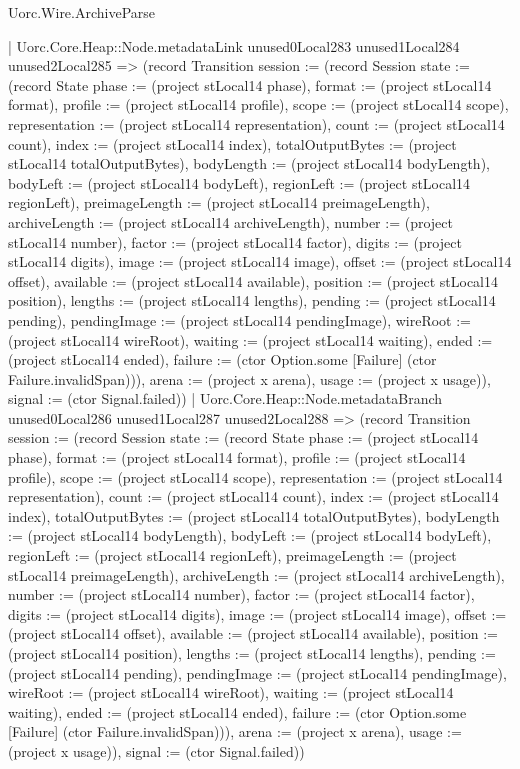 \begin{lexlean}{Uorc.Wire.ArchiveParse}
\begin{semanticmodule}
{            | Uorc.Core.Heap::Node.metadataLink unused0Local283 unused1Local284 unused2Local285 => (record Transition {session := (record Session {state := (record State {phase := (project stLocal14 phase), format := (project stLocal14 format), profile := (project stLocal14 profile), scope := (project stLocal14 scope), representation := (project stLocal14 representation), count := (project stLocal14 count), index := (project stLocal14 index), totalOutputBytes := (project stLocal14 totalOutputBytes), bodyLength := (project stLocal14 bodyLength), bodyLeft := (project stLocal14 bodyLeft), regionLeft := (project stLocal14 regionLeft), preimageLength := (project stLocal14 preimageLength), archiveLength := (project stLocal14 archiveLength), number := (project stLocal14 number), factor := (project stLocal14 factor), digits := (project stLocal14 digits), image := (project stLocal14 image), offset := (project stLocal14 offset), available := (project stLocal14 available), position := (project stLocal14 position), lengths := (project stLocal14 lengths), pending := (project stLocal14 pending), pendingImage := (project stLocal14 pendingImage), wireRoot := (project stLocal14 wireRoot), waiting := (project stLocal14 waiting), ended := (project stLocal14 ended), failure := (ctor Option.some [Failure] (ctor Failure.invalidSpan))}), arena := (project x arena), usage := (project x usage)}), signal := (ctor Signal.failed)})
            | Uorc.Core.Heap::Node.metadataBranch unused0Local286 unused1Local287 unused2Local288 => (record Transition {session := (record Session {state := (record State {phase := (project stLocal14 phase), format := (project stLocal14 format), profile := (project stLocal14 profile), scope := (project stLocal14 scope), representation := (project stLocal14 representation), count := (project stLocal14 count), index := (project stLocal14 index), totalOutputBytes := (project stLocal14 totalOutputBytes), bodyLength := (project stLocal14 bodyLength), bodyLeft := (project stLocal14 bodyLeft), regionLeft := (project stLocal14 regionLeft), preimageLength := (project stLocal14 preimageLength), archiveLength := (project stLocal14 archiveLength), number := (project stLocal14 number), factor := (project stLocal14 factor), digits := (project stLocal14 digits), image := (project stLocal14 image), offset := (project stLocal14 offset), available := (project stLocal14 available), position := (project stLocal14 position), lengths := (project stLocal14 lengths), pending := (project stLocal14 pending), pendingImage := (project stLocal14 pendingImage), wireRoot := (project stLocal14 wireRoot), waiting := (project stLocal14 waiting), ended := (project stLocal14 ended), failure := (ctor Option.some [Failure] (ctor Failure.invalidSpan))}), arena := (project x arena), usage := (project x usage)}), signal := (ctor Signal.failed)})
}
\end{semanticmodule}
\end{lexlean}
